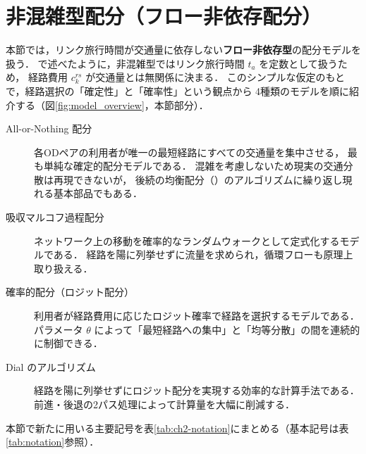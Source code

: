 
\section{非混雑型配分（フロー非依存配分）}
\label{sec:ch2-uncongested}

本節では，リンク旅行時間が交通量に依存しない\textbf{フロー非依存型}の配分モデルを扱う．
  で述べたように，非混雑型ではリンク旅行時間 $t_a$ を定数として扱うため，
経路費用 $c_k^{rs}$ が交通量とは無関係に決まる．
このシンプルな仮定のもとで，経路選択の「確定性」と「確率性」という観点から
4種類のモデルを順に紹介する（図\ref{fig:model_overview}，本節部分）．

\begin{description}
  \item[ All-or-Nothing 配分]
    各ODペアの利用者が唯一の最短経路にすべての交通量を集中させる，
    最も単純な確定的配分モデルである．
    混雑を考慮しないため現実の交通分散は再現できないが，
    後続の均衡配分（）のアルゴリズムに繰り返し現れる基本部品でもある．

  \item[ 吸収マルコフ過程配分]
    ネットワーク上の移動を確率的なランダムウォークとして定式化するモデルである．
    経路を陽に列挙せずに流量を求められ，循環フローも原理上取り扱える\cite{Akamatsu1996}．

  \item[ 確率的配分（ロジット配分）]
    利用者が経路費用に応じたロジット確率で経路を選択するモデルである\cite{McFadden1974}．
    パラメータ $\theta$ によって「最短経路への集中」と「均等分散」の間を連続的に制御できる．

  \item[ Dial のアルゴリズム]
    経路を陽に列挙せずにロジット配分を実現する効率的な計算手法である\cite{Dial1971}．
    前進・後退の2パス処理によって計算量を大幅に削減する．
\end{description}

本節で新たに用いる主要記号を表\ref{tab:ch2-notation}にまとめる（基本記号は表\ref{tab:notation}参照）．

